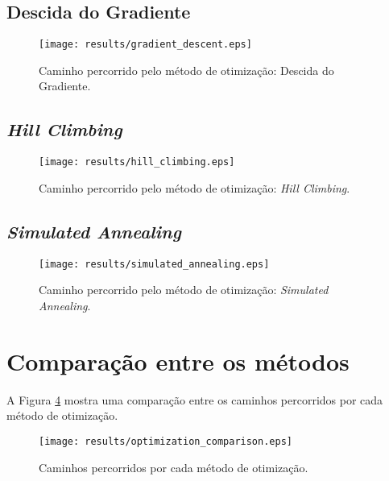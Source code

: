 \documentclass[brazil, 12pt]{article}
\begin{document}
\subsection{Descida do Gradiente}
\begin{figure}[H]
\centering
\texttt{[image: results/gradient\_descent.eps]} %
\caption{Caminho percorrido pelo método de otimização: Descida do Gradiente.} %
\label{fig:gradient_descent}  %
\end{figure} 

\subsection{\emph{Hill Climbing}}
\begin{figure}[H]
	\centering
	\texttt{[image: results/hill\_climbing.eps]} %
	\caption{Caminho percorrido pelo método de otimização: \textit{Hill Climbing}.} %
	\label{fig:hill_climbing}  %
\end{figure}

\subsection{\emph{Simulated Annealing}}
\begin{figure}[H]
	\centering
	\texttt{[image: results/simulated\_annealing.eps]} %
	\caption{Caminho percorrido pelo método de otimização: \textit{Simulated Annealing}.} %
	\label{fig:simulated_annealing}  %
\end{figure}


\section{Comparação entre os métodos}
A Figura \ref{fig:optimization_comparison} mostra uma comparação entre os caminhos percorridos por cada método de otimização.

\begin{figure}[H]
	\centering
	\texttt{[image: results/optimization\_comparison.eps]} %
	\caption{Caminhos percorridos por cada método de otimização.} %
	\label{fig:optimization_comparison}  %
\end{figure}
\end{document}
